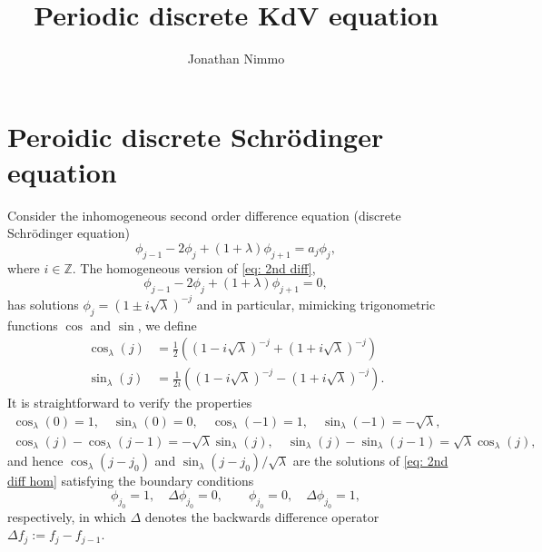 \documentclass[11pt]{article}
\author{Jonathan Nimmo}
\title{Periodic discrete KdV equation}
\date{}
\theoremstyle{definition}
\begin{document}
\maketitle
\tableofcontents
\section{Peroidic discrete Schr\"odinger equation}

Consider the inhomogeneous second order difference equation (discrete Schr\"odinger equation)
\begin{equation}\label{eq: 2nd diff}
\phi_{j-1}-2\phi_{j}+(1+\lambda)\phi_{j+1}=a_{j}\phi_{j},
\end{equation}
where $i\in\mathbb Z$. The homogeneous version of \eqref{eq: 2nd diff}, 
\begin{equation}\label{eq: 2nd diff hom}
\phi_{j-1}-2\phi_{j}+(1+\lambda)\phi_{j+1}=0,
\end{equation}
has solutions $\phi_{j}=(1\pm i \sqrt\lambda)^{-j}$ and in particular, mimicking trigonometric functions $\cos$ and $\sin$, we define
\begin{align}
	\cos_\lambda(j)&=\frac12((1-i\sqrt\lambda)^{-j}+(1+i\sqrt\lambda)^{-j})\\
	\sin_\lambda(j)&=\frac1{2i}((1-i\sqrt\lambda)^{-j}-(1+i\sqrt\lambda)^{-j}).
\end{align}
It is straightforward to verify the properties
\begin{gather}
\label{eq:trig prop1}
	\cos_\lambda(0)=1,\quad \sin_\lambda(0)=0,\quad\cos_\lambda(-1)=1,\quad \sin_\lambda(-1)=-\sqrt\lambda,\\
\label{eq:trig prop2}
	\cos_\lambda(j)-\cos_\lambda(j-1)=-\sqrt\lambda\sin_\lambda(j),\quad\sin_\lambda(j)-\sin_\lambda(j-1)=\sqrt\lambda\cos_\lambda(j),
\end{gather}
and hence $\cos_\lambda(j-j_0)$ and $\sin_\lambda(j-j_0)/\sqrt\lambda$ are the solutions of \eqref{eq: 2nd diff hom} satisfying the boundary conditions
\begin{equation}
	\phi_{j_0}=1,\quad \Delta\phi_{j_0}=0,\qquad
	\phi_{j_0}=0,\quad \Delta\phi_{j_0}=1,
\end{equation}
respectively, in which $\Delta$ denotes the backwards difference operator $\Delta f_{j}:=f_{j}-f_{j-1}$.
\end{document}
